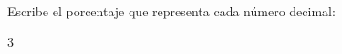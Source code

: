 Escribe el porcentaje que representa cada número decimal:

      \begin{multicols}{3}
      \end{multicols}